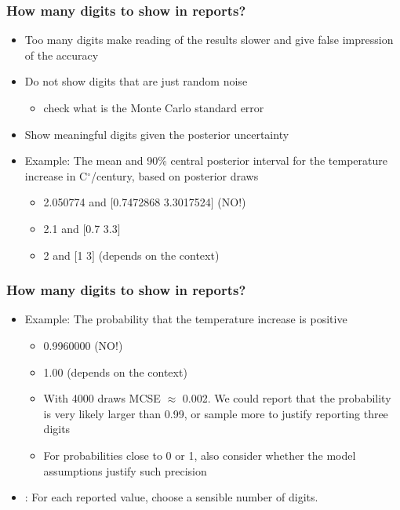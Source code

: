 \documentclass[10pt]{beamer}
\begin{document}
\begin{frame}

\frametitle{How many digits to show in reports?}


  \begin{itemize}
  \item Too many digits make reading of the results slower and give
    false impression of the accuracy
  \item<2-> Do not show digits that are just random noise
    \begin{itemize}
    \item check what is the Monte Carlo standard error
    \end{itemize}
  \item<3-> Show meaningful digits given the posterior uncertainty
  \item<4-> Example: The mean and 90\% central posterior interval for the
     temperature increase in C$^\circ$/century, based on posterior draws
     \begin{itemize}
     \item<5-> {\color{red} 2.050774 and $[$0.7472868 3.3017524$]$} (NO!)
     \item<6-> {\color{uured} 2.1 and $[$0.7 3.3$]$}
    \item<7-> {\color{uured} 2 and $[$1 3$]$} (depends on the context)
     \end{itemize}
  \end{itemize}

\end{frame}


\begin{frame}

\frametitle{How many digits to show in reports?}


  \begin{itemize}

   \item Example: The probability that the temperature increase is positive
     \pause
     \begin{itemize}
     \item {\color{red} 0.9960000} (NO!)
     \pause
     \item {\color{uured} 1.00} (depends on the context)
     \pause
     \item With 4000 draws MCSE $\approx$ 0.002. We could report
       that the probability is {\color{uured} very likely larger than 0.99}, or sample
       more to justify reporting three digits
       \pause
     \item For probabilities close to 0 or 1, also consider whether the
       model assumptions justify such precision
     \end{itemize}
     \pause
   \item {}: For each reported value, choose a
     sensible number of digits.
  \end{itemize}

\end{frame}
\end{document}
